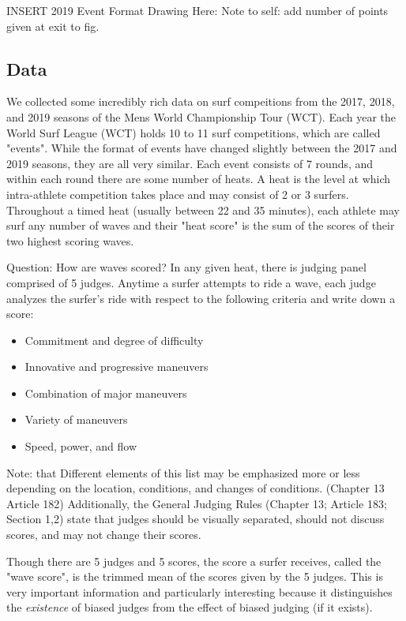 \documentclass[12pt,a4paper]{article}
\begin{document}
INSERT 2019 Event Format Drawing Here: Note to self: add number of points given at exit to fig.

\subsection{Data}

We collected some incredibly rich data on surf compeitions from the 2017, 2018, and 2019 seasons of the Mens World Championship Tour (WCT). Each year the World Surf League (WCT) holds 10 to 11 surf competitions, which are called "events". While the format of events have changed slightly between the 2017 and 2019 seasons, they are all very similar. Each event consists of 7 rounds, and within each round there are some number of heats. A heat is the level at which intra-athlete competition takes place and may consist of 2 or 3 surfers. Throughout a timed heat (usually between 22 and 35 minutes), each athlete may surf any number of waves and their "heat score" is the sum of the scores of their two highest scoring waves. 


Question: How are waves scored? In any given heat, there is judging panel comprised of 5 judges. Anytime a surfer attempts to ride a wave, each judge analyzes the surfer's ride with respect to the following criteria and write down a score:

\begin{itemize}
\item Commitment and degree of difficulty


\item Innovative and progressive maneuvers


\item Combination of major maneuvers


\item Variety of maneuvers


\item Speed, power, and flow

\end{itemize}
Note: that Different elements of this list may be emphasized more or less depending on the location, conditions, and changes of conditions. (Chapter 13 Article 182) Additionally, the General Judging Rules (Chapter 13; Article 183; Section 1,2) state that judges should be visually separated, should not discuss scores, and may not change their scores.


Though there are 5 judges and 5 scores, the score a surfer receives, called the "wave score", is the trimmed mean of the scores given by the 5 judges. This is very important information and particularly interesting because it distinguishes the \emph{existence} of biased judges from the effect of biased judging (if it exists).
\end{document}
